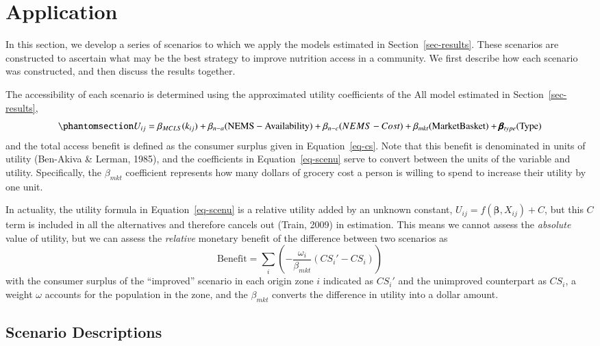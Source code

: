 \documentclass[
  letterpaper,
  number,
  review,
  3p]{elsarticle}
\begin{document}

\section{Application}\label{sec-scenarios}

In this section, we develop a series of scenarios to which we apply the
models estimated in Section~\ref{sec-results}. These scenarios are
constructed to ascertain what may be the best strategy to improve
nutrition access in a community. We first describe how each scenario was
constructed, and then discuss the results together.

The accessibility of each scenario is determined using the approximated
utility coefficients of the All model estimated in
Section~\ref{sec-results},
\begin{equation}\phantomsection\label{eq-scenu}{
U_{ij}= \beta_{MCLS}( k_{ij}) +  \beta_{n-a} (\mathrm{NEMS-Availability}) +
  \beta_{n-c}\mathrm({NEMS-Cost}) + \\ \beta_{mkt} (\mathrm{Market Basket}) + \pmb{\beta}_{type}(\mathrm{Type})  
}\end{equation} and the total access benefit is defined as the consumer
surplus given in Equation~\ref{eq-cs}. Note that this benefit is
denominated in units of utility (Ben-Akiva \& Lerman, 1985), and the
coefficients in Equation~\ref{eq-scenu} serve to convert between the
units of the variable and utility. Specifically, the \(\beta_{mkt}\)
coefficient represents how many dollars of grocery cost a person is
willing to spend to increase their utility by one unit.

In actuality, the utility formula in Equation~\ref{eq-scenu} is a
relative utility added by an unknown constant,
\(U_{ij} = f(\mathbf{\beta}, X_{ij}) + C\), but this \(C\) term is
included in all the alternatives and therefore cancels out (Train, 2009)
in estimation. This means we cannot assess the \emph{absolute} value of
utility, but we can assess the \emph{relative} monetary benefit of the
difference between two scenarios as \[
\mathrm{Benefit} = \sum_{i}\left(-\frac{\omega_i}{\beta_{mkt}}(CS_i' - CS_i)\right)
\] with the consumer surplus of the ``improved'' scenario in each origin
zone \(i\) indicated as \(CS_i'\) and the unimproved counterpart as
\(CS_i\), a weight \(\omega\) accounts for the population in the zone,
and the \(\beta_{mkt}\) converts the difference in utility into a dollar
amount.

\subsection{Scenario Descriptions}\label{scenario-descriptions}
\end{document}
